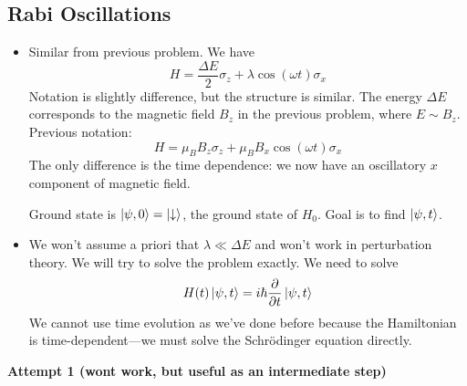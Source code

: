 \documentclass[11pt, a4paper]{article}
\newcommand{\Schro}{Schr\"{o}dinger\xspace}
\newcommand{\Ham}{Hamiltonian\xspace}
\newcommand{\p}{\psi}  %
\newcommand{\da}{\downarrow}  %
\begin{document}
\subsection{Rabi Oscillations} 
\begin{itemize}
	\item Similar from previous problem. We have
	\begin{equation*}
		H = \frac{\Delta E}{2}\sigma_{z} + \lambda \cos (\omega t )\sigma_{x}
	\end{equation*}
	Notation is slightly difference, but the structure is similar. The energy $ \Delta E $ corresponds to the magnetic field $ B_{z} $ in the previous problem, where $ E \sim B_{z} $. 
	Previous notation:
	\begin{equation*}
		H = \mu_{B}B_{z}\sigma_{z} + \mu_{B}B_{x}\cos (\omega t) \sigma_{x}
	\end{equation*}
	The only difference is the time dependence: we now have an oscillatory $ x $ component of magnetic field.
	
	Ground state is $ \ket{\p, 0} = \ket{\da} $, the ground state of $ H_{0} $. Goal is to find $ \ket{\p, t} $. 
	
	

	\item We won't assume a priori that $ \lambda \ll \Delta E $ and won't work in perturbation theory. We will try to solve the problem exactly. We need to solve
	\begin{equation*}
		H(t) \ket{\p, t} = i \hbar \pdv{t}\ket{\p, t}
	\end{equation*}
	We cannot use time evolution as we've done before because the \Ham is time-dependent---we must solve the \Schro equation directly.
\end{itemize}
\textbf{Attempt 1 (wont work, but useful as an intermediate step)}
\end{document}

